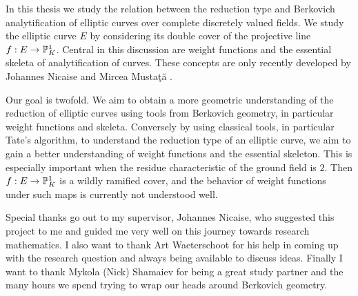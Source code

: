 In this thesis we study the relation between the reduction type and Berkovich analytification of elliptic curves over complete discretely valued fields. 
We study the elliptic curve $E$ by considering its double cover of the projective line $f:E \to \mathbb{P}^{1}_K$.
Central in this discussion are weight functions and the essential skeleta of analytification of curves. 
These concepts are only recently developed by Johannes Nicaise and Mircea Mustaţă \cite{mustataWeightFunctionsNonArchimedean2015}.

Our goal is twofold. We aim to obtain a more geometric understanding of the reduction of elliptic curves using tools from Berkovich geometry, in particular weight functions and skeleta. 
Conversely by using classical tools, in particular Tate's algorithm, to understand the reduction type of an elliptic curve, we aim to gain a better understanding of weight functions and the essential skeleton. 
This is especially important when the residue characteristic of the ground field is $2$. 
Then $f: E \to \mathbb{P}^{1}_K$ is a wildly ramified cover, and the behavior of weight functions under such maps is currently not understood well.  

\medskip

Special thanks go out to my supervisor, Johannes Nicaise, who suggested this project to me and guided me very well on this journey towards research mathematics. 
I also want to thank Art Waeterschoot for his help in coming up with the research question and always being available to discuss ideas. 
Finally I want to thank Mykola (Nick) Shamaiev for being a great study partner and the many hours we spend trying to wrap our heads around Berkovich geometry. 


